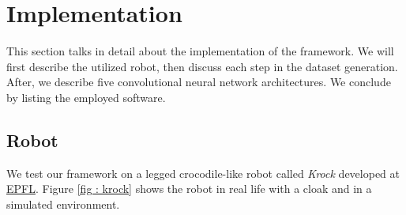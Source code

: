 \documentclass[../document.tex]{subfiles}
\begin{document}
\chapter{Implementation}
\label{chap: implementation}
This section talks in detail about the implementation of the framework. We will first describe the utilized robot, then discuss each step in the dataset generation. After, we describe five convolutional neural network architectures.  We conclude by listing the employed software.
\section{Robot}
We test our framework on a legged crocodile-like robot called \emph{Krock} developed at \href{https://biorob.epfl.ch/}{EPFL}. Figure \ref{fig : krock} shows the robot in real life with a cloak and in a simulated environment.
\end{document}
